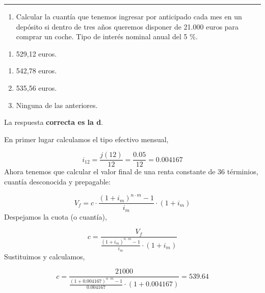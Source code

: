 \documentclass[
  letterpaper,
  DIV=11,
  numbers=noendperiod]{scrreprt}
\providecommand{\tightlist}{%
  \setlength{\itemsep}{0pt}\setlength{\parskip}{0pt}}\usepackage{longtable,booktabs,array}
\begin{document}
\begin{center}\rule{0.5\linewidth}{0.5pt}\end{center}

\begin{enumerate}
\def\labelenumi{\arabic{enumi}.}
\setcounter{enumi}{76}
\tightlist
\item
  Calcular la cuantía que tenemos ingresar por anticipado cada mes en un
  depósito si dentro de tres años queremos disponer de 21.000 euros para
  comprar un coche. Tipo de interés nominal anual del 5 \%.
\end{enumerate}

\begin{enumerate}
\def\labelenumi{\alph{enumi})}
\tightlist
\item
  529,12 euros.
\end{enumerate}

\begin{enumerate}
\def\labelenumi{\alph{enumi}.}
\setcounter{enumi}{1}
\item
  542,78 euros.
\item
  535,56 euros.
\item
  Ninguna de las anteriores.
\end{enumerate}

\begin{tcolorbox}[enhanced jigsaw, left=2mm, opacityback=0, colback=white, breakable, arc=.35mm, bottomrule=.15mm, rightrule=.15mm, toprule=.15mm, leftrule=.75mm, colframe=quarto-callout-tip-color-frame]
\begin{minipage}[t]{5.5mm}
\textcolor{quarto-callout-tip-color}{\faLightbulb}
\end{minipage}%
\begin{minipage}[t]{\textwidth - 5.5mm}

La respuesta \textbf{correcta es la d}.

En primer lugar calculamos el tipo efectivo mensual,

\[i_{12}=\frac{j\left(12\right)}{12}=\frac{0.05}{12}=0.004167\] Ahora
tenemos que calcular el valor final de una renta constante de 36
términios, cuantía desconocida y prepagable:

\[V_f=c\cdot\frac{\left(1+i_m\right)^{n\cdot m}-1}{i_m}\cdot\left(1+i_m\right)\]
Despejamos la cuota (o cuantía),

\[c=\frac{V_f }{\frac{\left(1+i_m\right)^{n\cdot m}-1}{i_m}\cdot\left(1+i_m\right) }\]
Sustituimos y calculamos,

\[c=\frac{21000 }{\frac{\left(1+0.004167\right)^{n\cdot m}-1}{0.004167}\cdot\left(1+0.004167\right) }=539.64\]

\end{minipage}%
\end{tcolorbox}
\end{document}
